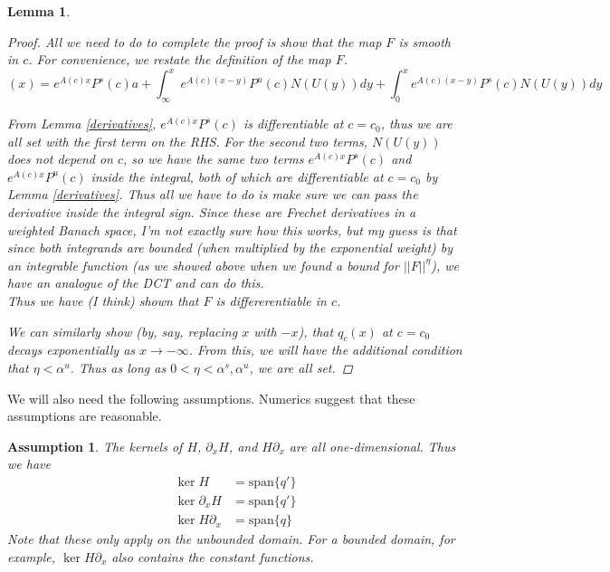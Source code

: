 \documentclass[12pt]{article}
\newtheorem{lemma}{Lemma}
\newtheorem{assumption}{Assumption}
\begin{document}
\begin{lemma}
\begin{proof}
All we need to do to complete the proof is show that the map $F$ is smooth in $c$. For convenience, we restate the definition of the map $F$.\\

\begin{equation}
[F(U, c, a)](x) = e^{A(c)x} P^s(c) a + \int_\infty^x e^{A(c)(x - y)}P^u(c) N(U(y))dy + \int_0^x e^{A(c)(x - y)}P^s(c) N(U(y))dy
\end{equation}

From Lemma \ref{derivatives}, $e^{A(c)x} P^s(c)$ is differentiable at $c = c_0$, thus we are all set with the first term on the RHS. For the second two terms, $N(U(y))$ does not depend on $c$, so we have the same two terms $e^{A(c)x} P^s(c)$ and $e^{A(c)x} P^u(c)$ inside the integral, both of which are differentiable at $c = c_0$ by Lemma \ref{derivatives}. Thus all we have to do is make sure we can pass the derivative inside the integral sign. Since these are Frechet derivatives in a weighted Banach space, I'm not exactly sure how this works, but my guess is that since both integrands are bounded (when multiplied by the exponential weight) by an integrable function (as we showed above when we found a bound for $||F||^\eta$), we have an analogue of the DCT and can do this.\\

Thus we have (I think) shown that $F$ is differerentiable in $c$.

We can similarly show (by, say, replacing $x$ with $-x$), that $q_c(x)$ at $c = c_0$ decays exponentially as $x \rightarrow -\infty$. From this, we will have the additional condition that $\eta < \alpha^u$. Thus as long as $0 < \eta < \alpha^s, \alpha^u$, we are all set.

\end{proof}
\end{lemma}

We will also need the following assumptions. Numerics suggest that these assumptions are reasonable.

\begin{assumption}\label{1dkernel}
The kernels of $H$, $\partial_x H$, and $H \partial_x$ are all one-dimensional. Thus we have
\begin{align*}
\ker H &= \text{span}\{ q' \} \\
\ker \partial_x H &= \text{span}\{ q' \} \\
\ker H \partial_x &= \text{span}\{ q \}
\end{align*}
Note that these only apply on the unbounded domain. For a bounded domain, for example, $\ker H \partial_x$ also contains the constant functions.
\end{assumption}
\end{document}
